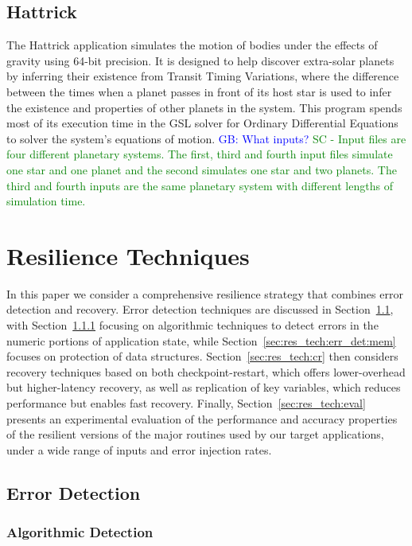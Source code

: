 \documentclass{sig-alternate}
\newcommand{\sui}[1]{%
  \textcolor{green}{SC - #1}
}
\newcommand{\greg}[1]{%
  \textcolor{blue}{GB: #1}
}
\begin{document}
\subsection{Hattrick}
\label{sec:apps:hattrick}
The Hattrick application simulates the motion of bodies under the effects of gravity using 64-bit precision.
It is designed to help discover extra-solar planets by inferring their existence from Transit Timing Variations, where the difference between the times when a planet passes in front of its host star is used to infer the existence and properties of other planets in the system.
This program spends most of its execution time in the GSL solver for Ordinary Differential Equations to solver the system's equations of motion.
\greg{What inputs?} \sui{Input files are four different planetary systems. The first, third and fourth input files simulate one star and one planet and the second simulates one star and two planets. The third and fourth inputs are the same planetary system with different lengths of simulation time.}

\section{Resilience Techniques}
\label{sec:res_tech}

In this paper we consider a comprehensive resilience strategy that combines error detection and recovery.
Error detection techniques are discussed in Section~\ref{sec:res_tech:err_det}, with Section~\ref{sec:res_tech:err_det:algo} focusing on algorithmic techniques to detect errors in the numeric portions of application state, while Section~\ref{sec:res_tech:err_det:mem} focuses on protection of data structures.
Section~\ref{sec:res_tech:cr} then considers recovery techniques based on both checkpoint-restart, which offers lower-overhead but higher-latency recovery, as well as replication of key variables, which reduces performance but enables fast recovery.
Finally, Section~\ref{sec:res_tech:eval} presents an experimental evaluation of the performance and accuracy properties of the resilient versions of the major routines used by our target applications, under a wide range of inputs and error injection rates.

\subsection{Error Detection}
\label{sec:res_tech:err_det}

\subsubsection{Algorithmic Detection}
\label{sec:res_tech:err_det:algo}
\end{document}

